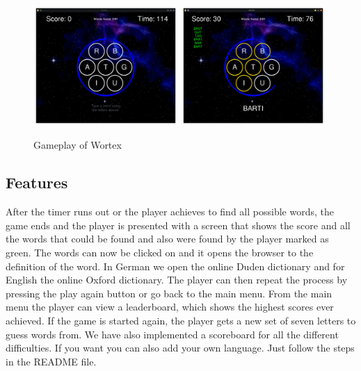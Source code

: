 \documentclass{article}[12pt]
\begin{document}
    
    \begin{figure}[ht]
        \includegraphics[width=0.49\textwidth]{pictures/gameplay.png}
        \includegraphics[width=0.49\textwidth]{pictures/mid_game.png}
        \caption{Gameplay of Wortex}
    \end{figure}

    \subsection*{Features}
    
    After the timer runs out or the player achieves to find all possible words,
    the game ends and the player is presented with a screen that shows the
    score and all the words that could be found and also were found by the
    player marked as green. The words can now be clicked on and it opens the
    browser to the definition of the word. In German we open the online Duden
    dictionary and for English the online Oxford dictionary. The player can
    then repeat the process by pressing the play again button or go back to the
    main menu. From the main menu the player can view a leaderboard, which
    shows the highest scores ever achieved. If the game is started again, the
    player gets a new set of seven letters to guess words from. We have also
    implemented a scoreboard for all the different difficulties. If you want
    you can also add your own language. Just follow the steps in the README
    file. 
\end{document}
